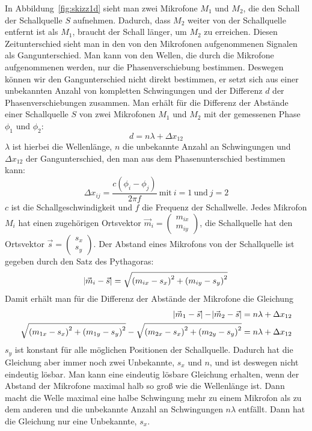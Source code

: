 In Abbildung~\ref{fig:skizz1d} sieht man zwei Mikrofone $M_1$ und $M_2$, die den Schall der Schallquelle $S$ aufnehmen. Dadurch, dass $M_2$ weiter von der Schallquelle entfernt ist als $M_1$, braucht der Schall länger, um $M_2$ zu erreichen. Diesen Zeitunterschied sieht man in den von den Mikrofonen aufgenommenen Signalen als Gangunterschied. Man kann von den Wellen, die durch die Mikrofone aufgenommenen werden, nur die Phasenverschiebung bestimmen. Deswegen können wir den Gangunterschied nicht direkt bestimmen, er setzt sich aus einer unbekannten Anzahl von kompletten Schwingungen und der Differenz $d$ der Phasenverschiebungen zusammen. Man erhält für die Differenz der Abstände einer Schallquelle $S$ von zwei Mikrofonen $M_1$ und $M_2$ mit der gemessenen Phase $\phi_1$ und $\phi_2$: $$d = n\lambda + \Delta{x_{12}}$$ $\lambda$ ist hierbei die Wellenlänge, $n$ die unbekannte Anzahl an Schwingungen und $\Delta{x_{12}}$ der Gangunterschied, den man aus dem Phasenunterschied bestimmen kann:
\begin{equation}
\Delta{x_{ij}} = \frac{c(\phi_i - \phi_j)}{{2\pi}f}\:\textrm{mit}\:i = 1\:\textrm{und}\:j = 2
\end{equation}
$c$ ist die Schallgeschwindigkeit und $f$ die Frequenz der Schallwelle.
Jedes Mikrofon $M_i$ hat einen zugehörigen Ortsvektor $\vec{m}_i = \begin{pmatrix} m_{ix} \\ m_{iy}  \end{pmatrix}$, die Schallquelle hat den Ortsvektor $\vec{s} = \begin{pmatrix} {s_x} \\ {s_y}  \end{pmatrix}$. Der Abstand eines Mikrofons von der Schallquelle ist gegeben durch den Satz des Pythagoras:
\begin{equation}
\abs{\vec{m}_i - \vec{s}} = \sqrt{{(m_{ix} - s_x)}^2 + {(m_{iy} - s_y)}^2}
\end{equation}
Damit erhält man für die Differenz der Abstände der Mikrofone die Gleichung
\begin{align}
\abs{\vec{m}_1 - \vec{s}} - \abs{\vec{m}_2 - \vec{s}} &= n\lambda + \Delta{x_{12}}\\
\sqrt{{(m_{1x} - s_x)}^2 + {(m_{1y} - s_y)}^2} - \sqrt{{(m_{2x} - s_x)}^2 + {(m_{2y} - s_y)}^2} &= n\lambda + \Delta{x_{12}}
\end{align}
$s_y$ ist konstant für alle möglichen Positionen der Schallquelle. Dadurch hat die Gleichung aber immer noch zwei Unbekannte, $s_x$ und $n$, und ist deswegen nicht eindeutig lösbar. Man kann eine eindeutig lösbare Gleichung erhalten, wenn der Abstand der Mikrofone maximal halb so groß wie die Wellenlänge ist. Dann macht die Welle maximal eine halbe Schwingung mehr zu einem Mikrofon als zu dem anderen und die unbekannte Anzahl an Schwingungen $n\lambda$ entfällt. Dann hat die Gleichung nur eine Unbekannte, $s_x$.
